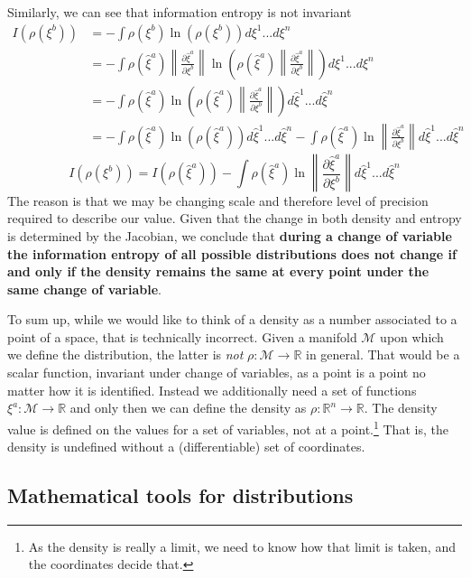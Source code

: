 \documentclass[11pt]{elsarticle}
\begin{document}
Similarly, we can see that information entropy is not invariant
\begin{align*}
I(\rho(\xi^b)) &=-\int \rho(\xi^b) \ln (\rho(\xi^b)) d\xi^1 ... d\xi^n \\
&=-\int \rho(\hat{\xi}^a) \left\|\frac{\partial \hat{\xi}^a}{\partial \xi^b}\right\| \ln \left(\rho(\hat{\xi}^a) \left\|\frac{\partial \hat{\xi}^a}{\partial \xi^b}\right\|\right) d\xi^1 ... d\xi^n \\
&=-\int \rho(\hat{\xi}^a) \ln \left(\rho(\hat{\xi}^a) \left\|\frac{\partial \hat{\xi}^a}{\partial \xi^b}\right\|\right) d\hat{\xi}^1 ... d\hat{\xi}^n \\
&=-\int \rho(\hat{\xi}^a) \ln (\rho(\hat{\xi}^a)) d\hat{\xi}^1 ... d\hat{\xi}^n -\int \rho(\hat{\xi}^a) \ln \left\|\frac{\partial \hat{\xi}^a}{\partial \xi^b}\right\| d\hat{\xi}^1 ... d\hat{\xi}^n
\end{align*}
\begin{equation}\label{entropy_transformation}
I(\rho(\xi^b)) =I(\rho(\hat{\xi}^a)) -\int \rho(\hat{\xi}^a) \ln \left\|\frac{\partial \hat{\xi}^a}{\partial \xi^b}\right\| d\hat{\xi}^1 ... d\hat{\xi}^n
\end{equation}
The reason is that we may be changing scale and therefore level of precision required to describe our value. Given that the change in both density and entropy is determined by the Jacobian, we conclude that \textbf{during a change of variable the information entropy of all possible distributions does not change if and only if the density remains the same at every point under the same change of variable}.

To sum up, while we would like to think of a density as a number associated to a point of a space, that is technically incorrect. Given a manifold $\mathcal{M}$ upon which we define the distribution, the latter is \emph{not} $\rho : \mathcal{M} \to \mathbb{R}$ in general. That would be a scalar function, invariant under change of variables, as a point is a point no matter how it is identified. Instead we additionally need a set of functions $\xi^a : \mathcal{M} \to \mathbb{R}$ and only then we can define the density as $\rho : \mathbb{R}^n \to \mathbb{R}$. The density value is defined on the values for a set of variables, not at a point.\footnote{As the density is really a limit, we need to know how that limit is taken, and the coordinates decide that.} That is, the density is undefined without a (differentiable) set of coordinates.

\subsection*{Mathematical tools for distributions}
\end{document}
